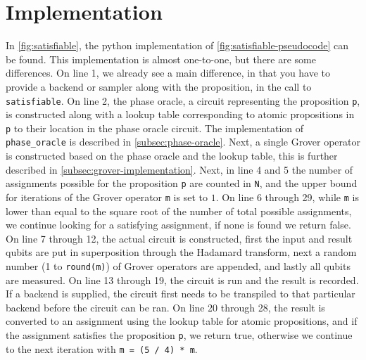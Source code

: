 \section{Implementation}\label{sec:implementation}

In \autoref{fig:satisfiable}, the python implementation of \autoref{fig:satisfiable-pseudocode} can be found.
This implementation is almost one-to-one, but there are some differences.
On line 1, we already see a main difference, in that you have to provide a backend or sampler along with the proposition, in the call to \texttt{satisfiable}.
On line 2, the phase oracle, a circuit representing the proposition \texttt{p}, is constructed along with a lookup table corresponding to atomic propositions in \texttt{p} to their location in the phase oracle circuit.
The implementation of \texttt{phase\_oracle} is described in \autoref{subsec:phase-oracle}.
Next, a single Grover operator is constructed based on the phase oracle and the lookup table, this is further described in \autoref{subsec:grover-implementation}.
Next, in line 4 and 5 the number of assignments possible for the proposition \texttt{p} are counted in \texttt{N}, and the upper bound for iterations of the Grover operator \texttt{m} is set to $1$.
On line 6 through 29, while \texttt{m} is lower than equal to the square root of the number of total possible assignments, we continue looking for a satisfying assignment, if none is found we return false.
On line 7 through 12, the actual circuit is constructed, first the input and result qubits are put in superposition through the Hadamard transform, next a random number (1 to \texttt{round(m)}) of Grover operators are appended, and lastly all qubits are measured.
On line 13 through 19, the circuit is run and the result is recorded.
If a backend is supplied, the circuit first needs to be transpiled to that particular backend before the circuit can be ran.
On line 20 through 28, the result is converted to an assignment using the lookup table for atomic propositions, and if the assignment satisfies the proposition \texttt{p}, we return true, otherwise we continue to the next iteration with \texttt{m = (5 / 4) * m}.

